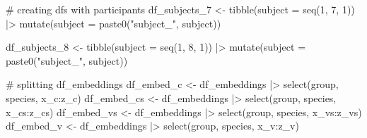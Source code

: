 \documentclass[
  authoryear]{elsarticle}
\newenvironment{Shaded}{\begin{snugshade}}{\end{snugshade}}
\newcommand{\CommentTok}[1]{\textcolor[rgb]{0.37,0.37,0.37}{#1}}
\newcommand{\DecValTok}[1]{\textcolor[rgb]{0.68,0.00,0.00}{#1}}
\newcommand{\NormalTok}[1]{\textcolor[rgb]{0.00,0.23,0.31}{#1}}
\newcommand{\OperatorTok}[1]{\textcolor[rgb]{0.37,0.37,0.37}{#1}}
\newcommand{\StringTok}[1]{\textcolor[rgb]{0.13,0.47,0.30}{#1}}
\begin{document}
\begin{Shaded}
\begin{Highlighting}[]
\CommentTok{\# creating dfs with participants}
\NormalTok{df\_subjects\_7 }\OperatorTok{\textless{}{-}} 
\NormalTok{  tibble(subject }\OperatorTok{=}\NormalTok{ seq(}\DecValTok{1}\NormalTok{, }\DecValTok{7}\NormalTok{, }\DecValTok{1}\NormalTok{)) }\OperatorTok{|\textgreater{}} 
\NormalTok{  mutate(subject }\OperatorTok{=}\NormalTok{ paste0(}\StringTok{"subject\_"}\NormalTok{, subject))}

\NormalTok{df\_subjects\_8 }\OperatorTok{\textless{}{-}} 
\NormalTok{  tibble(subject }\OperatorTok{=}\NormalTok{ seq(}\DecValTok{1}\NormalTok{, }\DecValTok{8}\NormalTok{, }\DecValTok{1}\NormalTok{)) }\OperatorTok{|\textgreater{}} 
\NormalTok{  mutate(subject }\OperatorTok{=}\NormalTok{ paste0(}\StringTok{"subject\_"}\NormalTok{, subject))}

\CommentTok{\# splitting df\_embeddings}
\NormalTok{df\_embed\_c  }\OperatorTok{\textless{}{-}}\NormalTok{ df\_embeddings }\OperatorTok{|\textgreater{}}\NormalTok{ select(group, species,  x\_c:z\_c)}
\NormalTok{df\_embed\_cs }\OperatorTok{\textless{}{-}}\NormalTok{ df\_embeddings }\OperatorTok{|\textgreater{}}\NormalTok{ select(group, species, x\_cs:z\_cs)}
\NormalTok{df\_embed\_vs }\OperatorTok{\textless{}{-}}\NormalTok{ df\_embeddings }\OperatorTok{|\textgreater{}}\NormalTok{ select(group, species, x\_vs:z\_vs)}
\NormalTok{df\_embed\_v  }\OperatorTok{\textless{}{-}}\NormalTok{ df\_embeddings }\OperatorTok{|\textgreater{}}\NormalTok{ select(group, species,  x\_v:z\_v)}


\end{Highlighting}
\end{Shaded}
\end{document}
